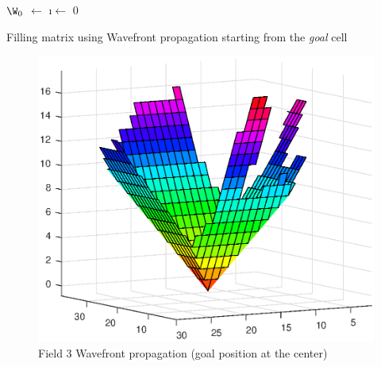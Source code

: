 \begin{algorithm}
	
	\BlankLine
	
  	$\W_0$ $\leftarrow$ \GCell \;
	\i $\leftarrow$ 0 \;
\caption{Filling matrix using Wavefront propagation starting from the \textit{goal} cell}
\label{alg:Bambi-Wavefront}
\end{algorithm}

\begin{figure}[ht]
    \centering
    \includegraphics[width=1\textwidth]{figures/C3/WavefrontSurfF3-3.eps}
    \caption{Field 3 Wavefront propagation (goal position at the center)}
    \label{fig:iwavefront-surf-f3}
\end{figure}


